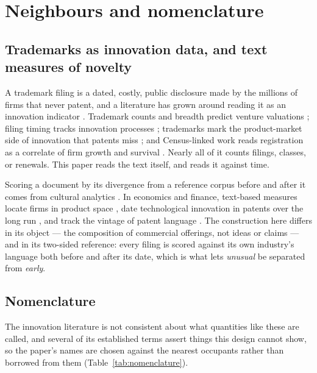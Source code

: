 \section{Neighbours and nomenclature}\label{sec:related}

\subsection{Trademarks as innovation data, and text measures of novelty}

A trademark filing is a dated, costly, public disclosure made by the
millions of firms that never patent, and a literature has grown around
reading it as an innovation indicator \citep{Castaldi2020, Willeke2026}.
Trademark counts and breadth predict venture valuations
\citep{Block2014}; filing timing tracks innovation processes
\citep{Seip2018}; trademarks mark the product-market side of innovation
that patents miss \citep{Flikkema2019, Flikkema2025}; and Census-linked
work reads registration as a correlate of firm growth and survival
\citep{Dinlersoz2018, Dinlersoz2023}. Nearly all of it counts filings,
classes, or renewals. This paper reads the text itself, and reads it
against time.

Scoring a document by its divergence from a reference corpus before and
after it comes from cultural analytics \citep{Murdock2017, Barron2018}.
In economics and finance, text-based measures locate firms in product
space \citep{HobergPhillips2016}, date technological innovation in
patents over the long run \citep{Kelly2021}, and track the vintage of
patent language \citep{Kalyani2024}. The construction here differs in
its object --- the composition of commercial offerings, not ideas or
claims --- and in its two-sided reference: every filing is scored
against its own industry's language both before and after its date,
which is what lets \emph{unusual} be separated from \emph{early}.

\subsection{Nomenclature}\label{sec:nomenclature}

The innovation literature is not consistent about what quantities like
these are called, and several of its established terms assert things
this design cannot show, so the paper's names are chosen against the
nearest occupants rather than borrowed from them
(Table~\ref{tab:nomenclature}).


